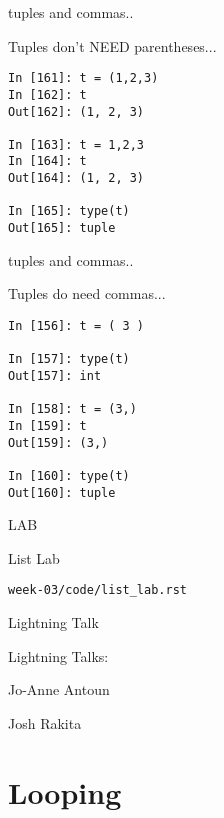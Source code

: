 \documentclass{beamer}
\begin{document}
\begin{frame}[fragile]{tuples and commas..}

{\Large  Tuples don't NEED parentheses... }

\begin{verbatim}
In [161]: t = (1,2,3)
In [162]: t
Out[162]: (1, 2, 3)

In [163]: t = 1,2,3
In [164]: t
Out[164]: (1, 2, 3)

In [165]: type(t)
Out[165]: tuple
\end{verbatim}

\end{frame}

\begin{frame}[fragile]{tuples and commas..}

{\Large  Tuples do need commas... }

\begin{verbatim}
In [156]: t = ( 3 )

In [157]: type(t)
Out[157]: int

In [158]: t = (3,)
In [159]: t
Out[159]: (3,)

In [160]: type(t)
Out[160]: tuple
\end{verbatim}

\end{frame}


\begin{frame}[fragile]{LAB}

\vfill
{\LARGE List Lab}

\vfill
\verb|week-03/code/list_lab.rst|

\vfill

\end{frame}

\begin{frame}{Lightning Talk}

{\LARGE Lightning Talks:}

\vfill
{\large Jo-Anne Antoun}

\vfill
{\large Josh Rakita}

\end{frame}



\section{Looping}
\end{document}
